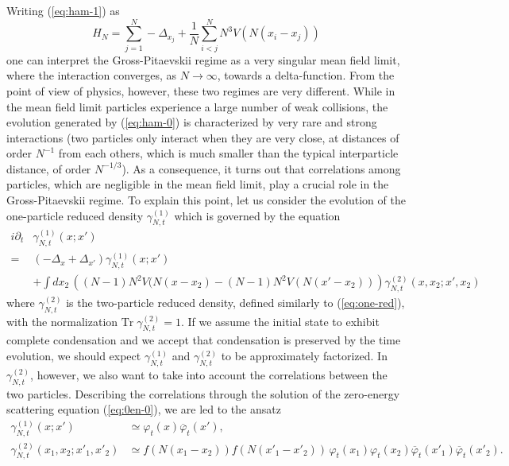\documentclass[11pt,a4paper]{article}
\newcommand{\tr}{\mbox{Tr}}
\begin{document}
Writing (\ref{eq:ham-1}) as
\begin{equation}\label{eq:ham-11} H_N = \sum_{j=1}^N -\Delta_{x_j} + \frac{1}{N} \sum_{i<j}^N N^3 V (N (x_i - x_j)) \end{equation}
one can interpret the Gross-Pitaevskii regime as a very singular mean field limit, where the interaction converges, as $N \to \infty$, towards a delta-function. {F}rom the point of view of physics, however, these two regimes are very different. While in the mean field limit particles experience a large number of weak collisions, the evolution generated by (\ref{eq:ham-0}) is characterized by very rare and strong interactions (two particles only interact when they are very close, at distances of order $N^{-1}$ from each others, which is much smaller than the typical interparticle distance, of order $N^{-1/3}$). As a consequence, it turns out that correlations among particles, which are negligible in the mean field limit, play a crucial role in the Gross-Pitaevskii regime. To explain this point, let us consider the evolution of the one-particle reduced density $\gamma^{(1)}_{N,t}$ which is governed by the equation 
\begin{equation}\label{eq:BBGKY1} \begin{split} 
i\partial_t & \gamma^{(1)}_{N,t} (x;x') \\ = \; & \left( -\Delta_x + \Delta_{x'} \right) \gamma^{(1)}_{N,t} (x;x')  
\\ &+ \int dx_2 \, \left( (N-1) N^2 V (N (x-x_2) - (N-1) N^2 V(N (x'-x_2)) \right) \gamma^{(2)}_{N,t} (x,x_2 ; x',x_2) \end{split} \end{equation}
where $\gamma^{(2)}_{N,t}$ is the two-particle reduced density, defined similarly to 
(\ref{eq:one-red}), with the normalization $\tr \; \gamma^{(2)}_{N,t} = 1$. If we assume the initial 
state to exhibit complete condensation and we accept that condensation is preserved by the time evolution, we should expect $\gamma^{(1)}_{N,t}$ and $\gamma^{(2)}_{N,t}$ to be approximately factorized. In $\gamma^{(2)}_{N,t}$, however, we also want to take into account the correlations between the two particles. Describing the correlations through the solution of the zero-energy scattering equation (\ref{eq:0en-0}), we are led to the ansatz
\begin{equation}\label{eq:ans-mod} \begin{split} 
\gamma^{(1)}_{N,t} (x;x') &\simeq \varphi_t (x) \overline{\varphi}_t (x'), \\
\gamma^{(2)}_{N,t} (x_1, x_2; x'_1, x'_2) &\simeq  f (N (x_1 - x_2)) f (N
(x'_1- x'_2)) \, \varphi_t (x_1)  \varphi_t (x_2) \overline{\varphi}_t
(x'_1) \overline{\varphi}_t (x'_2).
\end{split} \end{equation}
\end{document}
